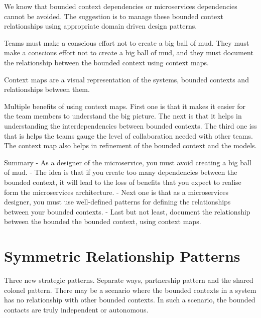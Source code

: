 \documentclass[a4paper, 11pt]{book}
\begin{document}
    We know that bounded context dependencies or microservices dependencies cannot be avoided.
    The suggestion is to manage these bounded context relationships using appropriate domain driven design patterns.

    Teams must make a conscious effort not to create a big ball of mud.
    They must make a conscious effort not to create a big ball of mud, and they must document the relationship between the bounded context using context maps.

    Context maps are a visual representation of the systems, bounded contexts and relationships between them.

    Multiple benefits of using context maps.
    First one is that it makes it easier for the team members to understand the big picture.
    The next is that it helps in understanding the interdependencies between bounded contexts.
    The third one iss that is helps the teams gauge the level of collaboration needed with other teams.
    The context map also helps in refinement of the bounded context and the models.

    Summary
    - As a designer of the microservice, you must avoid creating a big ball of mud.
    - The idea is that if you create too many dependencies between the bounded context, it will lead to the loss of benefits that you expect to realise form the microservices architecture.
    - Next one is that as a microservices designer, you must use well-defined patterns for defining the relationships between your bounded contexts.
    - Last but not least, document the relationship between the bounded the bounded context, using context maps.


    \section{Symmetric Relationship Patterns}

    Three new strategic patterns.
    Separate ways, partnership pattern and the shared colonel pattern.
    There may be a scenario where the bounded contexts in a system has no relationship with other bounded contexts.
    In such a scenario, the bounded contacts are truly independent or autonomous.
\end{document}
